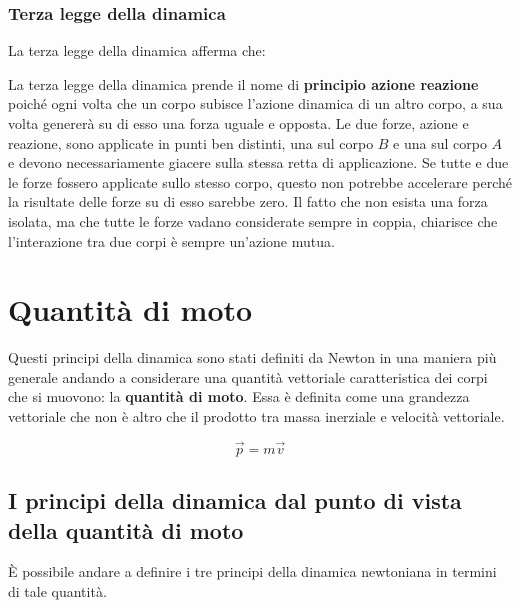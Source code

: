 \subsubsection{Terza legge della dinamica}

La terza legge della dinamica afferma che:

\noindent{}

La terza legge della dinamica prende il nome di \textbf{principio azione reazione} poiché ogni volta che un corpo subisce l'azione dinamica di un altro corpo, a sua volta genererà su di esso una forza uguale e opposta. Le due forze, azione e reazione, sono applicate in punti ben distinti, una sul corpo $B$ e una sul corpo $A$ e devono necessariamente giacere sulla stessa retta di applicazione. Se tutte e due le forze fossero applicate sullo stesso corpo, questo non potrebbe accelerare perché la risultate delle forze su di esso sarebbe zero. Il fatto che non esista una forza isolata, ma che tutte le forze vadano considerate sempre in coppia, chiarisce che l'interazione tra due corpi è sempre un'azione mutua.

\section{Quantità di moto}

Questi principi della dinamica sono stati definiti da Newton in una maniera più generale andando a considerare una quantità vettoriale caratteristica dei corpi che si muovono: la \textbf{quantità di moto}. Essa è definita come una grandezza vettoriale che non è altro che il prodotto tra massa inerziale e velocità vettoriale.

\[
	\vec{p}=m\vec{v}
\]

\subsection{I principi della dinamica dal punto di vista della quantità di moto}
È possibile andare a definire i tre principi della dinamica newtoniana in termini di tale quantità.

